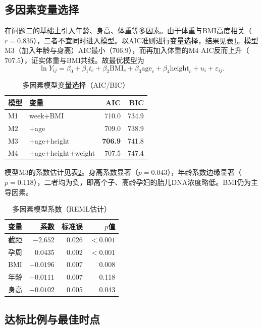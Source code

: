 \documentclass[12pt]{ctexart}
\begin{document}
\subsection{多因素变量选择}

在问题二的基础上引入年龄、身高、体重等多因素。由于体重与BMI高度相关（$r=0.835$），二者不宜同时进入模型。以AIC准则进行变量选择，结果见表\ref{tab:aic}。模型M3（加入年龄与身高）AIC最小（$706.9$），而再加入体重的M4 AIC反而上升（$707.5$），证实体重与BMI共线。故最优模型为
\begin{equation}
\ln Y_{ij} = \beta_0 + \beta_1 t_c + \beta_2 \mathrm{BMI}_c + \beta_3 \mathrm{age}_c + \beta_4 \mathrm{height}_c + u_i + \varepsilon_{ij}.
\end{equation}

\begin{table}[H]
\centering
\caption{多因素模型变量选择（AIC/BIC）}
\label{tab:aic}
\begin{tabular}{llrr}
\toprule
模型 & 变量 & AIC & BIC \\
\midrule
M1 & week+BMI & 710.0 & 734.9 \\
M2 & +age & 709.0 & 738.9 \\
M3 & +age+height & \textbf{706.9} & 741.8 \\
M4 & +age+height+weight & 707.5 & 747.4 \\
\bottomrule
\end{tabular}
\end{table}

模型M3的系数估计见表\ref{tab:m3coef}。身高系数显著（$p=0.043$），年龄系数边缘显著（$p=0.118$），二者均为负，即高个子、高龄孕妇的胎儿DNA浓度略低。BMI仍为主导因素。

\begin{table}[H]
\centering
\caption{多因素模型系数（REML估计）}
\label{tab:m3coef}
\begin{tabular}{lrrr}
\toprule
变量 & 系数 & 标准误 & $p$值 \\
\midrule
截距 & $-2.652$ & 0.026 & $<0.001$ \\
孕周 & 0.0435 & 0.002 & $<0.001$ \\
BMI & $-0.0196$ & 0.007 & 0.008 \\
年龄 & $-0.0111$ & 0.007 & 0.118 \\
身高 & $-0.0102$ & 0.005 & 0.043 \\
\bottomrule
\end{tabular}
\end{table}

\subsection{达标比例与最佳时点}
\end{document}
